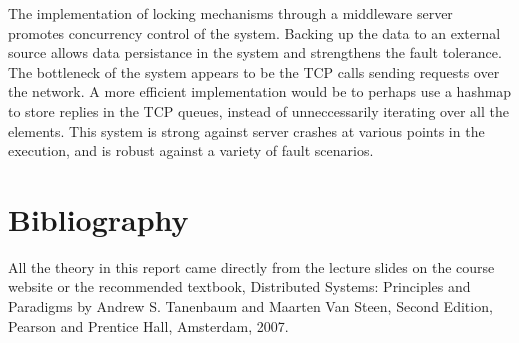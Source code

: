 \documentclass[letterpaper,12pt]{article}
\begin{document}
	The implementation of locking mechanisms through a middleware server promotes concurrency control of the system. Backing up the data to an external source allows data persistance in the system and strengthens the fault tolerance. The bottleneck of the system appears to be the TCP calls sending requests over the network. A more efficient implementation would be to perhaps use a hashmap to store replies in the TCP queues, instead of unneccessarily iterating over all the elements. This system is strong against server crashes at various points in the execution, and is robust against a variety of fault scenarios.
	
	\section{Bibliography}
	
	All the theory in this report came directly from the lecture slides on the course website or the recommended textbook, Distributed Systems: Principles and Paradigms by Andrew S. Tanenbaum and Maarten Van Steen, Second Edition, Pearson and Prentice Hall, Amsterdam, 2007. 
	
\end{document}
